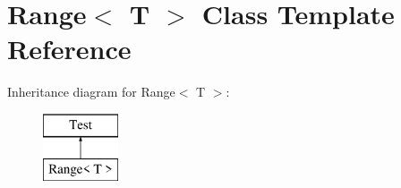 \hypertarget{class_range}{}\section{Range$<$ T $>$ Class Template Reference}
\label{class_range}
Inheritance diagram for Range$<$ T $>$\+:\begin{figure}[H]
\begin{center}
\leavevmode
\includegraphics[height=2.000000cm]{class_range}
\end{center}
\end{figure}
